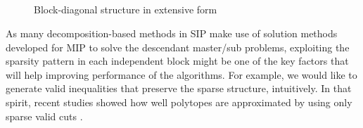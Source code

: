 \begin{figure}[]
	\centering
	~
	~

	~	
	~
	
	~	
	~
	
	~
	
	\caption{Block-diagonal structure in extensive form}
	\label{fig:de_structure}
\end{figure}

As many decomposition-based methods in SIP make use of solution methods developed for MIP to solve the descendant master/sub problems, exploiting the sparsity pattern in each independent block might be one of the key factors that will help improving performance of the algorithms. For example, we would like to generate valid inequalities that preserve the sparse structure, intuitively. In that spirit, recent studies showed how well polytopes are approximated by using only sparse valid cuts \cite{journal:DMW2015,journal:DIM2015}.


